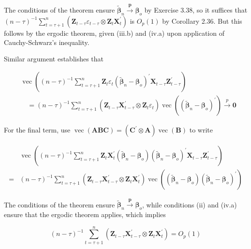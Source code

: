 \documentclass[10pt]{article}
\begin{document}
The conditions of the theorem ensure $\tilde{\boldsymbol{\beta}}_{n} \xrightarrow{\boldsymbol{p}} \boldsymbol{\beta}_{o}$ by Exercise 3.38, so it suffices that $(n-\tau)^{-1} \sum_{t=\tau+1}^{n}\left(\mathbf{Z}_{t-\tau} \varepsilon_{t-\tau} \otimes \mathbf{Z}_{t} \mathbf{X}_{t}^{\prime}\right)$ is $O_{p}(1)$ by Corollary 2.36. But this follows by the ergodic theorem, given (iii.b) and (iv.a) upon application of Cauchy-Schwarz's inequality.

Similar argument establishes that

$$
\begin{aligned}
& \operatorname{vec}\left((n-\tau)^{-1} \sum_{t=\tau+1}^{n} \mathbf{Z}_{t} \varepsilon_{t}\left(\tilde{\boldsymbol{\beta}}_{n}-\boldsymbol{\beta}_{o}\right)^{\prime} \mathbf{X}_{t-\tau} \mathbf{Z}_{t-\tau}^{\prime}\right) \\
& \quad=(n-\tau)^{-1} \sum_{t=\tau+1}^{n}\left(\mathbf{Z}_{t-\tau} \mathbf{X}_{t-\tau}^{\prime} \otimes \mathbf{Z}_{t} \varepsilon_{t}\right) \operatorname{vec}\left(\left(\tilde{\boldsymbol{\beta}}_{n}-\boldsymbol{\beta}_{o}\right)^{\prime}\right) \xrightarrow{p} \mathbf{0}
\end{aligned}
$$

For the final term, use $\operatorname{vec}(\mathbf{A B C})=\left(\mathbf{C}^{\prime} \otimes \mathbf{A}\right) \operatorname{vec}(\mathbf{B})$ to write

$$
\begin{aligned}
& \operatorname{vec}\left((n-\tau)^{-1} \sum_{t=\tau+1}^{n} \mathbf{Z}_{t} \mathbf{X}_{t}^{\prime}\left(\tilde{\boldsymbol{\beta}}_{n}-\boldsymbol{\beta}_{o}\right)\left(\tilde{\boldsymbol{\beta}}_{n}-\boldsymbol{\beta}_{o}\right)^{\prime} \mathbf{X}_{t-\tau} \mathbf{Z}_{t-\tau}^{\prime}\right) \\
= & (n-\tau)^{-1} \sum_{t=\tau+1}^{n}\left(\mathbf{Z}_{t-\tau} \mathbf{X}_{t-\tau}^{\prime} \otimes \mathbf{Z}_{t} \mathbf{X}_{t}^{\prime}\right) \operatorname{vec}\left(\left(\tilde{\boldsymbol{\beta}}_{n}-\boldsymbol{\beta}_{o}\right)\left(\tilde{\boldsymbol{\beta}}_{n}-\boldsymbol{\beta}_{o}\right)^{\prime}\right)
\end{aligned}
$$

The conditions of the theorem ensure $\tilde{\boldsymbol{\beta}}_{n} \xrightarrow{\boldsymbol{p}} \boldsymbol{\beta}_{o}$, while conditions (ii) and (iv.a) ensure that the ergodic theorem applies, which implies

$$
(n-\tau)^{-1} \sum_{t=\tau+1}^{n}\left(\mathbf{Z}_{t-\tau} \mathbf{X}_{t-\tau}^{\prime} \otimes \mathbf{Z}_{t} \mathbf{X}_{t}^{\prime}\right)=O_{p}(1)
$$
\end{document}
